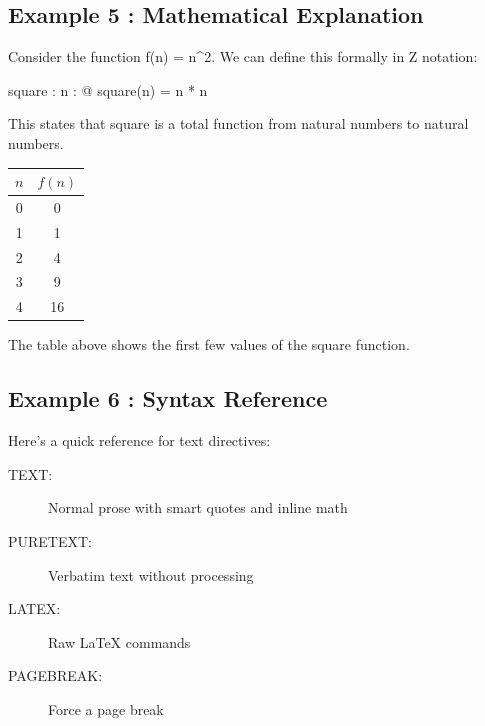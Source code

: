 \documentclass[a4paper,10pt,fleqn]{article}
\begin{document}
\subsection*{Example 5 : Mathematical Explanation}

\noindent Consider the function f(n) = n\textasciicircum{}2. We can define this formally in Z notation:

\bigskip

\begin{axdef}
square : \nat \fun \nat
\where
\forall n : \nat @ square(n) = n * n
\end{axdef}

\noindent This states that square is a total function from natural numbers to natural numbers.

\bigskip

\begin{center}

\begin{tabular}{c|c}

$n$ & $f(n)$ \\ \hline

0 & 0 \\

1 & 1 \\

2 & 4 \\

3 & 9 \\

4 & 16

\end{tabular}

\end{center}

\noindent The table above shows the first few values of the square function.

\bigskip

\subsection*{Example 6 : Syntax Reference}

\noindent Here's a quick reference for text directives:

\bigskip

\begin{description}

\item[TEXT:] Normal prose with smart quotes and inline math

\item[PURETEXT:] Verbatim text without processing

\item[LATEX:] Raw LaTeX commands

\item[PAGEBREAK:] Force a page break

\end{description}
\end{document}
